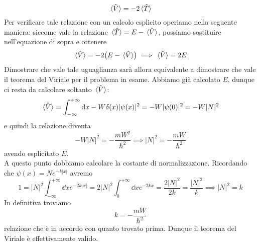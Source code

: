 \begin{soluzione}
   \begin{equation*}
      \expval*{\hat{V}}=-2\expval*{\hat{T}}
   \end{equation*}
   Per verificare tale relazione con un calcolo esplicito operiamo nella seguente maniera: siccome vale la relazione $\expval*{\hat{T}}=E - \expval*{\hat{V}}$, possiamo sostituire nell'equazione di sopra e ottenere
   \begin{equation*}
      \expval*{\hat{V}}=-2\bigl( E - \expval*{\hat{V}} \bigr)
      \implies
      \expval*{\hat{V}}=2E
   \end{equation*}
   Dimostrare che vale tale uguaglianza sarà allora equivalente a dimostrare che vale il teorema del Viriale per il problema in esame. Abbiamo già calcolato $E$, dunque ci resta da calcolare soltanto $\expval*{\hat{V}}$:
   \begin{equation*}
      \expval*{\hat{V}}
      =\int_{-\infty}^{+\infty} \dd{x} -W\delta(x) |\psi(x)|^2
      =-W |\psi(0)|^2
      =-W |N|^2
   \end{equation*}
   e quindi la relazione diventa
   \begin{equation*}
      -W |N|^2=-\frac{m W^2}{\hbar^2}
      \implies
      |N|^2=-\frac{m W}{\hbar^2}
   \end{equation*}
   avendo esplicitato $E$.\\
   A questo punto dobbiamo calcolare la costante di normalizzazione. Ricordando che $\psi(x)=Ne^{-k|x|}$ avremo
   \begin{equation*}
      1
      =|N|^2 \int_{-\infty}^{+\infty} \dd{x} e^{-2k|x|}
      =2|N|^2 \int_{0}^{+\infty} \dd{x} e^{-2kx}
      =\frac{2|N|^2}{2k}
      =\frac{|N|^2}{k}
      \implies
      |N|^2=k
   \end{equation*}
   In definitiva troviamo
   \begin{equation*}
      k=-\frac{m W}{\hbar^2}
   \end{equation*}
   relazione che è in accordo con quanto trovato prima. Dunque il teorema del Viriale è effettivamente valido.
\end{soluzione}

